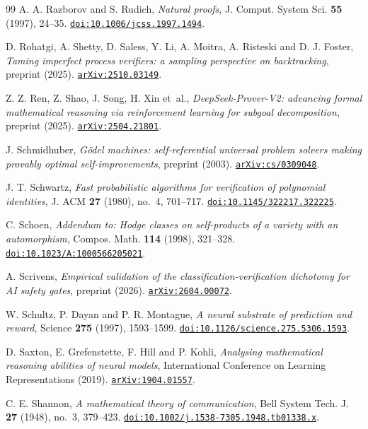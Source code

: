 \begin{thebibliography}{99}
A. A. Razborov and S. Rudich,
\emph{Natural proofs},
J. Comput. System Sci. \textbf{55} (1997), 24--35.
\href{https://doi.org/10.1006/jcss.1997.1494}{\nolinkurl{doi:10.1006/jcss.1997.1494}}.

D. Rohatgi, A. Shetty, D. Saless, Y. Li, A. Moitra, A. Risteski and D. J. Foster,
\emph{Taming imperfect process verifiers: a sampling perspective on backtracking},
preprint (2025).
\href{https://arxiv.org/abs/2510.03149}{\nolinkurl{arXiv:2510.03149}}.

Z. Z. Ren, Z. Shao, J. Song, H. Xin et~al.,
\emph{DeepSeek-Prover-V2: advancing formal mathematical reasoning via reinforcement learning for subgoal decomposition},
preprint (2025).
\href{https://arxiv.org/abs/2504.21801}{\nolinkurl{arXiv:2504.21801}}.

J. Schmidhuber,
\emph{G\"odel machines: self-referential universal problem solvers making provably optimal self-improvements},
preprint (2003).
\href{https://arxiv.org/abs/cs/0309048}{\nolinkurl{arXiv:cs/0309048}}.

J. T. Schwartz,
\emph{Fast probabilistic algorithms for verification of polynomial identities},
J. ACM \textbf{27} (1980), no.~4, 701--717.
\href{https://doi.org/10.1145/322217.322225}{\nolinkurl{doi:10.1145/322217.322225}}.

C. Schoen,
\emph{Addendum to: Hodge classes on self-products of a variety with an automorphism},
Compos. Math. \textbf{114} (1998), 321--328.
\href{https://doi.org/10.1023/A:1000566205021}{\nolinkurl{doi:10.1023/A:1000566205021}}.

A. Scrivens,
\emph{Empirical validation of the classification-verification dichotomy for AI safety gates},
preprint (2026).
\href{https://arxiv.org/abs/2604.00072}{\nolinkurl{arXiv:2604.00072}}.

W. Schultz, P. Dayan and P. R. Montague,
\emph{A neural substrate of prediction and reward},
Science \textbf{275} (1997), 1593--1599.
\href{https://doi.org/10.1126/science.275.5306.1593}{\nolinkurl{doi:10.1126/science.275.5306.1593}}.

D. Saxton, E. Grefenstette, F. Hill and P. Kohli,
\emph{Analysing mathematical reasoning abilities of neural models},
International Conference on Learning Representations (2019).
\href{https://arxiv.org/abs/1904.01557}{\nolinkurl{arXiv:1904.01557}}.

C. E. Shannon,
\emph{A mathematical theory of communication},
Bell System Tech. J. \textbf{27} (1948), no.~3, 379--423.
\href{https://doi.org/10.1002/j.1538-7305.1948.tb01338.x}{\nolinkurl{doi:10.1002/j.1538-7305.1948.tb01338.x}}.


\end{thebibliography}
